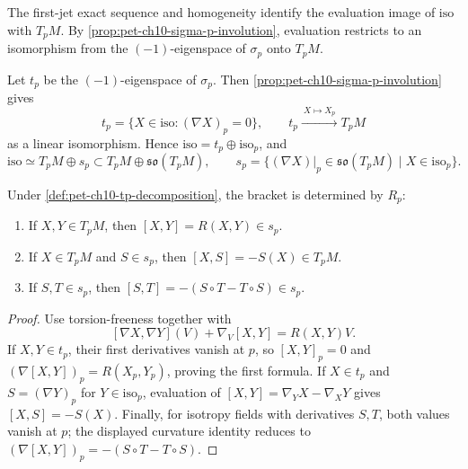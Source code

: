 The first-jet exact sequence and homogeneity identify the evaluation image of
$\mathrm{iso}$ with $T_pM$. By \cref{prop:pet-ch10-sigma-p-involution}, evaluation
restricts to an isomorphism from the $(-1)$-eigenspace of $\sigma_p$ onto
$T_pM$.

\begin{definition}
  \label{def:pet-ch10-tp-decomposition}

  Let $t_p$ be the $(-1)$-eigenspace of $\sigma_p$. Then
  \cref{prop:pet-ch10-sigma-p-involution} gives
  \[
    t_p=\{X\in\mathrm{iso}:(\nabla X)_p=0\},\qquad
    t_p\xrightarrow{\ X\mapsto X_p\ }T_pM
  \]
  as a linear isomorphism. Hence $\mathrm{iso}=t_p\oplus\mathrm{iso}_p$, and
  \[
    \mathrm{iso}\simeq T_pM\oplus s_p\subset T_pM\oplus\mathfrak{so}(T_pM),
    \qquad
    s_p=\{(\nabla X)|_p\in\mathfrak{so}(T_pM)\mid X\in\mathrm{iso}_p\}.
  \]
\end{definition}

\begin{proposition}
  \label{prop:pet-ch10-lie-bracket-curvature}

  Under \cref{def:pet-ch10-tp-decomposition}, the bracket is determined by
  $R_p$:
  \begin{enumerate}
    \item If $X,Y\in T_pM$, then $[X,Y]=R(X,Y)\in s_p$.
    \item If $X\in T_pM$ and $S\in s_p$, then $[X,S]=-S(X)\in T_pM$.
    \item If $S,T\in s_p$, then $[S,T]=-(S\circ T-T\circ S)\in s_p$.
  \end{enumerate}
\end{proposition}
\begin{proof}
  \sketch
  Use torsion-freeness together with
  \[
    [\nabla X,\nabla Y](V)+\nabla_V[X,Y]=R(X,Y)V.
  \]
  If $X,Y\in t_p$, their first derivatives vanish at $p$, so $[X,Y]_p=0$
  and $(\nabla[X,Y])_p=R(X_p,Y_p)$, proving the first formula. If
  $X\in t_p$ and $S=(\nabla Y)_p$ for $Y\in\mathrm{iso}_p$, evaluation of
  $[X,Y]=\nabla_YX-\nabla_XY$ gives $[X,S]=-S(X)$. Finally, for isotropy
  fields with derivatives $S,T$, both values vanish at $p$; the displayed
  curvature identity reduces to $(\nabla[X,Y])_p=-(S\circ T-T\circ S)$.
\end{proof}

